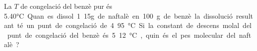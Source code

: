 \begin{qst}
La $T$ de congelació del benzè pur és 5.40\si\degreeCelsius. 
Quan es dissol 1.15g de naftalè en 100 g de benzè. la dissolució resultant té un punt de congelació de 4.95\si\degreeCelsius.
Si la constant de descens molal del punt de congelació del benzè és 5.12\si\degreeCelsius, quin és el pes molecular del naftalè?
\end{qst}
